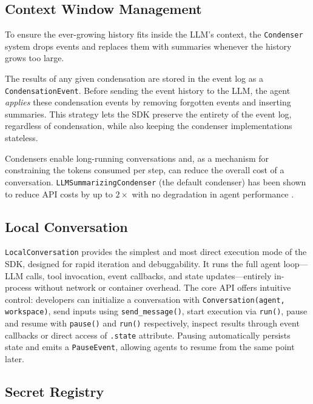 \subsection{Context Window Management}
\label{sec:context}

To ensure the ever-growing history fits inside the LLM's context, the \texttt{Condenser} system drops events and replaces them with summaries whenever the history grows too large. 

The results of any given condensation are stored in the event log as a \texttt{CondensationEvent}. Before sending the event history to the LLM, the agent \emph{applies} these condensation events by removing forgotten events and inserting summaries. This strategy lets the SDK preserve the entirety of the event log, regardless of condensation, while also keeping the condenser implementations stateless.

Condensers enable long-running conversations and, as a mechanism for constraining the tokens consumed per step, can reduce the overall cost of a conversation. \texttt{LLMSummarizingCondenser} (the default condenser) has been shown to reduce API costs by up to $2 \times$ with no degradation in agent performance \citep{smith2025-openhands-context-condensensation}.

\subsection{Local Conversation}
\label{sec:local-conversation}

\texttt{LocalConversation} provides the simplest and most direct execution mode of the SDK, designed for rapid iteration and debuggability. It runs the full agent loop—LLM calls, tool invocation, event callbacks, and state updates—entirely in-process without network or container overhead. The core API offers intuitive control: developers can initialize a conversation with \texttt{Conversation(agent, workspace)}, send inputs using \texttt{send\_message()}, start execution via \texttt{run()}, pause and resume with \texttt{pause()} and \texttt{run()} respectively, inspect results through event callbacks or direct access of \texttt{.state} attribute.
% 
Pausing automatically persists state and emits a \texttt{PauseEvent}, allowing agents to resume from the same point later. 


\subsection{Secret Registry}
\label{sec:secret-registry}

